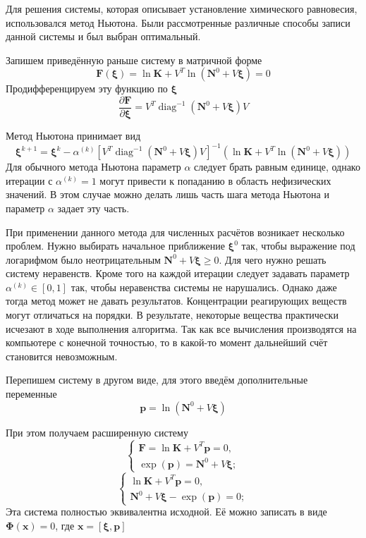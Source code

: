 \documentclass[14pt,a4paper]{extarticle}
\newcommand{\diag}{\operatorname{diag}}
\renewcommand{\vec}[1]{\boldsymbol{\mathbf{#1}}}
\renewcommand{\geq}{\geqslant}
\begin{document}
Для решения системы, которая описывает установление химического равновесия, использовался метод Ньютона. Были рассмотренные различные способы записи данной системы и был выбран оптимальный.

Запишем приведённую раньше систему в матричной форме$$\vec{F}(\vec \xi) = \ln{\vec{K}} + V^T \ln{(\vec{N}^0 + V\vec \xi)} = 0$$
Продифференцируем эту функцию по $\vec \xi$
$$\frac{\partial \vec{F}}{\partial{\vec{\xi}}} = V^T\diag^{-1}(\vec{N}^0 + V\vec{\xi})V$$

Метод Ньютона принимает вид
$$\vec{\xi}^{k+1} = \vec{\xi}^{k} - \alpha^{(k)}[V^T\diag^{-1}(\vec{N}^0 + V\vec{\xi})V]^{-1}(\ln{\vec{K}} + V^T \ln{(\vec{N}^0 + V\vec{\xi})})$$
Для обычного метода Ньютона параметр $\alpha$ следует брать равным единице, однако итерации с $\alpha^{(k)} = 1$ могут привести к попаданию в область нефизических значений. В этом случае можно делать лишь часть шага метода Ньютона и параметр $\alpha$ задает эту часть.   

При применении данного метода для численных расчётов возникает несколько проблем. Нужно выбирать начальное приближение $\vec{\xi}^0$ так, чтобы выражение под логарифмом было неотрицательным $\vec{N}^0 + V\vec{\xi}\geq 0$. Для чего нужно решать систему неравенств. Кроме того на каждой итерации следует задавать параметр $\alpha^{(k)} \in [0,1]$ так, чтобы неравенства системы не нарушались. Однако даже тогда метод может не давать результатов. Концентрации реагирующих веществ могут отличаться на порядки. В результате, некоторые вещества практически исчезают в ходе выполнения алгоритма. Так как все вычисления производятся на компьютере с конечной точностью, то в какой-то момент дальнейший счёт становится невозможным.

Перепишем систему в другом виде, для этого введём дополнительные переменные $$\vec{p} = \ln{(\vec{N}^0 + V\vec{\xi})}$$ 

При этом получаем расширенную систему
$$\begin{cases} 
	\vec{F} = \ln{\vec{K}} + V^T\vec{p}=0,\\
	\exp(\vec{p})=\vec{N}^0 + V\vec{\xi};
	
\end{cases}$$
$$\begin{cases} 
	\ln{\vec{K}} + V^T\vec{p}=0,\\
	\vec{N}^0 + V\vec{\xi} - \exp(\vec{p}) = 0;
\end{cases}$$
Эта система полностью эквивалентна исходной. Её можно записать в виде
$\vec{\Phi}(\vec{x}) = 0$, где $ \vec{x} = [\vec{\xi}, \vec{p}]$
\end{document}
